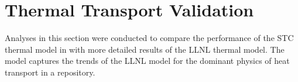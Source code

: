 \section{Thermal Transport Validation}\label{sec:thermal_benchmarks}

Analyses in this section were conducted to compare the performance of the 
\gls{STC} thermal model in \Cyder with more detailed results of the \gls{LLNL} 
thermal model. The \Cyder model captures the trends of the \gls{LLNL} model for 
the dominant physics of heat transport in a repository.


%



